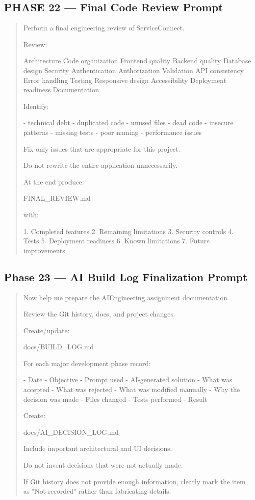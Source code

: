\subsection*{PHASE 22 --- Final Code Review Prompt}

\begin{quote}
Perform a final engineering review of ServiceConnect.

Review:

Architecture
Code organization
Frontend quality
Backend quality
Database design
Security
Authentication
Authorization
Validation
API consistency
Error handling
Testing
Responsive design
Accessibility
Deployment readiness
Documentation

Identify:

- technical debt
- duplicated code
- unused files
- dead code
- insecure patterns
- missing tests
- poor naming
- performance issues

Fix only issues that are appropriate for this project.

Do not rewrite the entire application unnecessarily.

At the end produce:

FINAL_REVIEW.md

with:

1. Completed features
2. Remaining limitations
3. Security controls
4. Tests
5. Deployment readiness
6. Known limitations
7. Future improvements
\end{quote}

\subsection*{Phase 23 --- AI Build Log Finalization Prompt}

\begin{quote}
Now help me prepare the AIEngineering assignment documentation.

Review the Git history, docs, and project changes.

Create/update:

docs/BUILD_LOG.md

For each major development phase record:

- Date
- Objective
- Prompt used
- AI-generated solution
- What was accepted
- What was rejected
- What was modified manually
- Why the decision was made
- Files changed
- Tests performed
- Result

Create:

docs/AI_DECISION_LOG.md

Include important architectural and UI decisions.

Do not invent decisions that were not actually made.

If Git history does not provide enough information, clearly mark
the item as "Not recorded" rather than fabricating details.
\end{quote}

